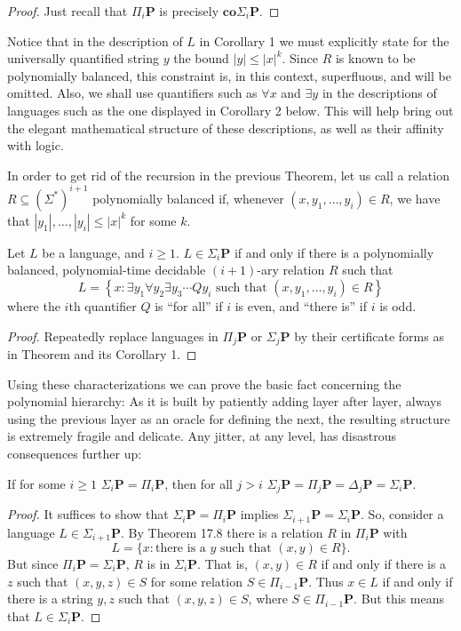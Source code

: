 \begin{proof}
Just recall that $\Pi_i\mathbf{P}$ is precisely $\mathbf{co}\Sigma_i\mathbf{P}$.
\end{proof}
Notice that in the description of $L$ in Corollary 1 we must explicitly state for the universally quantified string $y$ the bound $|y| \leq |x|^k$. Since $R$ is known to be polynomially balanced, this constraint is, in this context, superfluous, and will be omitted. Also, we shall use quantifiers such as $\forall x$ and $\exists y$ in the descriptions of languages such as the one displayed in Corollary 2 below. This will help bring out the elegant mathematical structure of these descriptions, as well as their affinity with logic.

\medskip

In order to get rid of the recursion in the previous Theorem, let us call a relation $R \subseteq (\Sigma^*)^{i+1}$ polynomially balanced if, whenever $(x, y_1, \ldots, y_i) \in R$, we have that $|y_1|, \ldots, |y_i| \leq |x|^k$ for some $k$.
\begin{defbox}[Corollary 2]
Let $L$ be a language, and $i \geq 1$. $L \in \Sigma_i\mathbf{P}$ if and only if there is a polynomially balanced, polynomial-time decidable $(i+1)$-ary relation $R$ such that
\[
L = \left\{ x : \exists y_1 \forall y_2 \exists y_3 \cdots Q y_i \text{ such that } (x, y_1, \ldots, y_i) \in R \right\}
\]
where the $i$th quantifier $Q$ is ``for all'' if $i$ is even, and ``there is'' if $i$ is odd.
\end{defbox}
\begin{proof}
    Repeatedly replace languages in $\Pi_j\mathbf{P}$ or $\Sigma_j\mathbf{P}$ by their certificate forms as in Theorem and its Corollary 1.
\end{proof}
Using these characterizations we can prove the basic fact concerning the polynomial hierarchy: As it is built by patiently adding layer after layer, always using the previous layer as an oracle for defining the next, the resulting structure is extremely fragile and delicate. Any jitter, at any level, has disastrous consequences further up:

\begin{defbox}[Theorem 17.9]
If for some $i \geq 1$ $\Sigma_i\mathbf{P} = \Pi_i\mathbf{P}$, then for all $j > i$ $\Sigma_j\mathbf{P} = \Pi_j\mathbf{P} = \Delta_j\mathbf{P} = \Sigma_i\mathbf{P}$.
\end{defbox}

\begin{proof}
It suffices to show that $\Sigma_i\mathbf{P} = \Pi_i\mathbf{P}$ implies $\Sigma_{i+1}\mathbf{P} = \Sigma_i\mathbf{P}$. So, consider a language $L \in \Sigma_{i+1}\mathbf{P}$. By Theorem 17.8 there is a relation $R$ in $\Pi_i\mathbf{P}$ with 
\[
L = \{x : \text{there is a } y \text{ such that } (x, y) \in R\}.
\]
But since $\Pi_i\mathbf{P} = \Sigma_i\mathbf{P}$, $R$ is in $\Sigma_i\mathbf{P}$. That is, $(x, y) \in R$ if and only if there is a $z$ such that $(x, y, z) \in S$ for some relation $S \in \Pi_{i-1}\mathbf{P}$. Thus $x \in L$ if and only if there is a string $y, z$ such that $(x, y, z) \in S$, where $S \in \Pi_{i-1}\mathbf{P}$. But this means that $L \in \Sigma_i\mathbf{P}$.
\end{proof}

